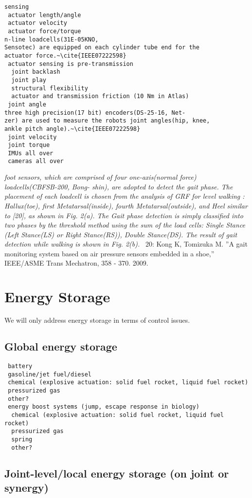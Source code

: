 \documentclass[letterpaper,12pt,fullpage]{article}
\begin{document}
\begin{verbatim}
sensing
 actuator length/angle
 actuator velocity
 actuator force/torque 
n-line loadcells(31E-05KNO,
Sensotec) are equipped on each cylinder tube end for the
actuator force.~\cite{IEEE07222598}
 actuator sensing is pre-transmission
  joint backlash
  joint play
  structural flexibility
  actuator and transmission friction (10 Nm in Atlas)
 joint angle
three high precision(17 bit) encoders(DS-25-16, Net-
zer) are used to measure the robots joint angles(hip, knee,
ankle pitch angle).~\cite{IEEE07222598}
 joint velocity
 joint torque
 IMUs all over
 cameras all over
\end{verbatim}

{\it foot sensors, which are comprised
of four one-axis(normal force) loadcells(CBFSB-200, Bong-
shin), are adopted to detect the gait phase. The placement
of each loadcell is chosen from the analysis of GRF for
level walking : Hallux(toe), first Metatarsal(inside), fourth
Metatarsal(outside), and Heel similar to [20], as shown in
Fig. 2(a). The Gait phase detection is simply classified
into two phases by the threshold method using the sum
of the load cells: Single Stance (Left Stance(LS) or Right
Stance(RS)), Double Stance(DS). The result of gait detection
while walking is shown in Fig. 2(b).}~\cite{IEEE07222598}
20: Kong K, Tomizuka M. ”A gait monitoring system based on air pressure
sensors embedded in a shoe,” IEEE/ASME Trans Mechatron, 358 - 370.
2009.

\section{Energy Storage}

We will only address energy storage
in terms of control issues.

\subsection{Global energy storage}

\begin{verbatim}
 battery
 gasoline/jet fuel/diesel
 chemical (explosive actuation: solid fuel rocket, liquid fuel rocket)
 pressurized gas
 other?
 energy boost systems (jump, escape response in biology)
  chemical (explosive actuation: solid fuel rocket, liquid fuel rocket)
  pressurized gas
  spring
  other?
\end{verbatim}

\subsection{Joint-level/local energy storage (on joint or synergy)}
\end{document}
